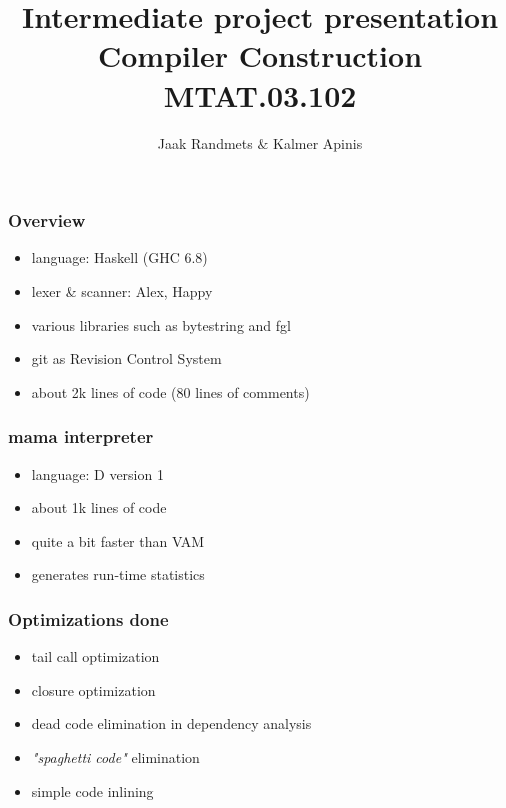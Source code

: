 \documentclass[14pt,xcolor=svgnames]{beamer}
\title[Tech Demo]{Intermediate project presentation \\ \small Compiler Construction MTAT.03.102}
\author{Jaak Randmets $\&$ Kalmer Apinis}
\institute[UT]{
  Department of Computer Science\\
  University of Tartu}
\date{}
\begin{document}

\maketitle

\begin{frame}
  \frametitle{Overview}
  \begin{itemize}
    \item language: Haskell (GHC 6.8)
    \item lexer \& scanner: Alex, Happy
    \item various libraries such as bytestring and fgl
    \item git as Revision Control System
    \item about 2k lines of code (80 lines of comments)
  \end{itemize}
\end{frame}


\begin{frame}
  \frametitle{mama interpreter}
  \begin{itemize}
    \item language: D version 1
    \item about 1k lines of code
    \item quite a bit faster than VAM
    \item generates run-time statistics
  \end{itemize}
\end{frame}

\begin{frame}
  \frametitle{Optimizations done}
  \begin{itemize}
    \item tail call optimization
    \item closure optimization
    \item dead code elimination in dependency analysis
    \item {\it "spaghetti code"} elimination
    \item simple code inlining
  \end{itemize}
\end{frame}
\end{document}
